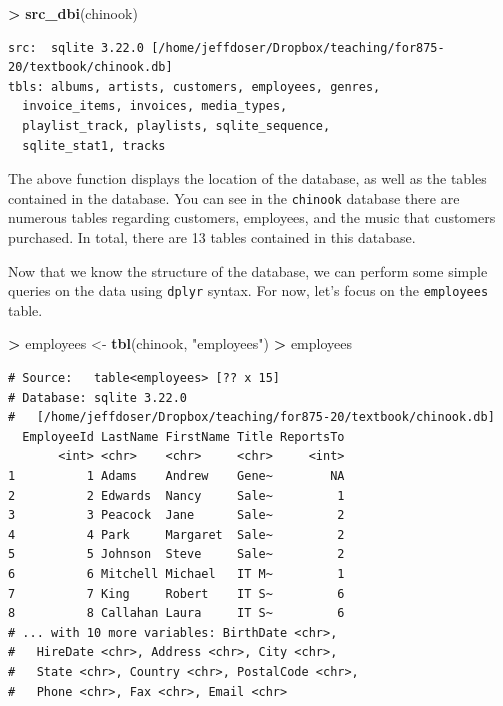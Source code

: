 \documentclass[
]{krantz}
\makeatletter
\newenvironment{Shaded}{\begin{snugshade}}{\end{snugshade}}
\newcommand{\KeywordTok}[1]{\textcolor[rgb]{0.27,0.27,0.27}{\textbf{#1}}}
\newcommand{\NormalTok}[1]{#1}
\newcommand{\OperatorTok}[1]{\textcolor[rgb]{0.43,0.43,0.43}{\textbf{#1}}}
\newcommand{\StringTok}[1]{\textcolor[rgb]{0.5,0.5,0.5}{#1}}
\newenvironment{kframe}{%
\medskip{}
\setlength{\fboxsep}{.8em}
 \def\at@end@of@kframe{}%
 \ifinner\ifhmode%
  \def\at@end@of@kframe{\end{minipage}}%
  \begin{minipage}{\columnwidth}%
 \fi\fi%
 \def\FrameCommand##1{\hskip\@totalleftmargin \hskip-\fboxsep
 \colorbox{shadecolor}{##1}\hskip-\fboxsep
     \hskip-\linewidth \hskip-\@totalleftmargin \hskip\columnwidth}%
 \MakeFramed {\advance\hsize-\width
   \@totalleftmargin\z@ \linewidth\hsize
   \@setminipage}}%
 {\par\unskip\endMakeFramed%
 \at@end@of@kframe}
\renewenvironment{Shaded}{\begin{kframe}}{\end{kframe}}
\makeatother
\begin{document}
\begin{Shaded}
\begin{Highlighting}[]
\OperatorTok{\textgreater{}}\StringTok{ }\KeywordTok{src\_dbi}\NormalTok{(chinook)}
\end{Highlighting}
\end{Shaded}

\begin{verbatim}
src:  sqlite 3.22.0 [/home/jeffdoser/Dropbox/teaching/for875-20/textbook/chinook.db]
tbls: albums, artists, customers, employees, genres,
  invoice_items, invoices, media_types,
  playlist_track, playlists, sqlite_sequence,
  sqlite_stat1, tracks
\end{verbatim}

The above function displays the location of the database, as well as the tables contained in the database. You can see in the \texttt{chinook} database there are numerous tables regarding customers, employees, and the music that customers purchased. In total, there are 13 tables contained in this database.

Now that we know the structure of the database, we can perform some simple queries on the data using \texttt{dplyr} syntax. For now, let's focus on the \texttt{employees} table.

\begin{Shaded}
\begin{Highlighting}[]
\OperatorTok{\textgreater{}}\StringTok{ }\NormalTok{employees \textless{}{-}}\StringTok{ }\KeywordTok{tbl}\NormalTok{(chinook, }\StringTok{"employees"}\NormalTok{)}
\OperatorTok{\textgreater{}}\StringTok{ }\NormalTok{employees}
\end{Highlighting}
\end{Shaded}

\begin{verbatim}
# Source:   table<employees> [?? x 15]
# Database: sqlite 3.22.0
#   [/home/jeffdoser/Dropbox/teaching/for875-20/textbook/chinook.db]
  EmployeeId LastName FirstName Title ReportsTo
       <int> <chr>    <chr>     <chr>     <int>
1          1 Adams    Andrew    Gene~        NA
2          2 Edwards  Nancy     Sale~         1
3          3 Peacock  Jane      Sale~         2
4          4 Park     Margaret  Sale~         2
5          5 Johnson  Steve     Sale~         2
6          6 Mitchell Michael   IT M~         1
7          7 King     Robert    IT S~         6
8          8 Callahan Laura     IT S~         6
# ... with 10 more variables: BirthDate <chr>,
#   HireDate <chr>, Address <chr>, City <chr>,
#   State <chr>, Country <chr>, PostalCode <chr>,
#   Phone <chr>, Fax <chr>, Email <chr>
\end{verbatim}
\end{document}

